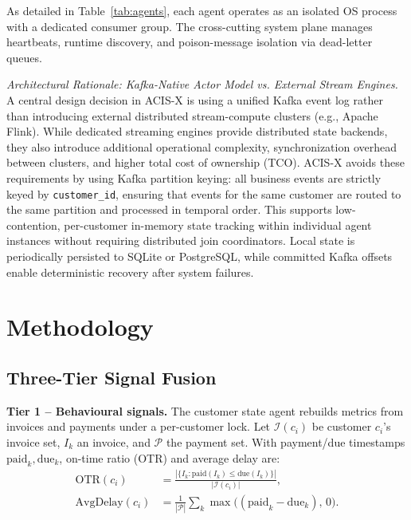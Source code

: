\documentclass[runningheads]{llncs}
\begin{document}
As detailed in Table~\ref{tab:agents}, each agent operates as an isolated OS process with a dedicated consumer group. The cross-cutting system plane manages heartbeats, runtime discovery, and poison-message isolation via dead-letter queues.

\noindent\textit{Architectural Rationale: Kafka-Native Actor Model vs. External Stream Engines.} A central design decision in ACIS-X is using a unified Kafka event log rather than introducing external distributed stream-compute clusters (e.g., Apache Flink). While dedicated streaming engines provide distributed state backends, they also introduce additional operational complexity, synchronization overhead between clusters, and higher total cost of ownership (TCO). ACIS-X avoids these requirements by using Kafka partition keying: all business events are strictly keyed by \texttt{customer\_id}, ensuring that events for the same customer
are routed to the same partition and processed in temporal order. This supports low-contention, per-customer in-memory state tracking within individual agent instances without requiring distributed join coordinators. Local state is periodically persisted to SQLite or PostgreSQL, while committed Kafka offsets enable deterministic recovery after system failures.

\section{Methodology}
\label{sec:methodology}

\subsection{Three-Tier Signal Fusion}

\textbf{Tier 1 -- Behavioural signals.} The customer state agent rebuilds metrics from invoices and payments under a per-customer lock. Let $\mathcal{I}(c_i)$ be customer $c_i$'s invoice set, $I_k$ an invoice, and $\mathcal{P}$ the payment set. With payment/due timestamps $\mathrm{paid}_k, \mathrm{due}_k$, on-time ratio (OTR) and average delay are:
\begin{equation}
\begin{split}
\mathrm{OTR}(c_i) &= \frac{|\{I_k : \mathrm{paid}(I_k)\leq\mathrm{due}(I_k)\}|}{|\mathcal{I}(c_i)|}, \\
\mathrm{AvgDelay}(c_i) &= \frac{1}{|\mathcal{P}|}\sum_{k}\max\bigl((\mathrm{paid}_k - \mathrm{due}_k),\,0\bigr).
\end{split}
\label{eq:behavioural}
\end{equation}
\end{document}
